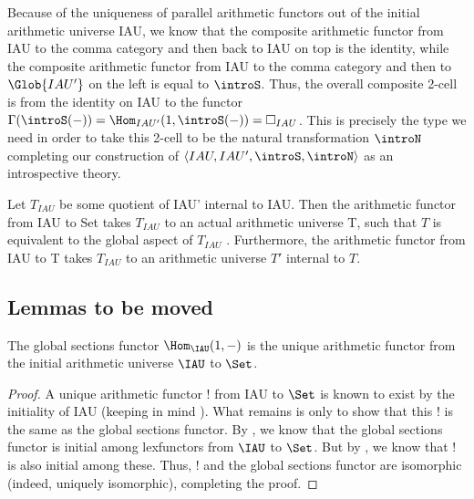 \begin{construction}
Because of the uniqueness of parallel arithmetic functors out of the initial arithmetic universe IAU, we know that the composite arithmetic functor from IAU to the comma category and then back to IAU on top is the identity, while the composite arithmetic functor from IAU to the comma category and then to $\Glob{IAU'}$ on the left is equal to $\introS$. Thus, the overall composite 2-cell is from the identity on IAU to the functor $\Gamma(\introS(-)) = \Hom_{IAU'}(1, \introS(-)) = \Box_{IAU}$. This is precisely the type we need in order to take this 2-cell to be the natural transformation $\introN$ completing our construction of $\langle IAU, IAU', \introS, \introN \rangle$ as an introspective theory.
\end{construction}



Let $T_{IAU}$ be some quotient of IAU' internal to IAU. Then the arithmetic functor from IAU to Set takes $T_{IAU}$ to an actual arithmetic universe T, such that $T$ is equivalent to the global aspect of $T_{IAU}$ . Furthermore, the arithmetic functor from IAU to T takes $T_{IAU}$ to an arithmetic universe $T'$ internal to $T$.

\subsection{Lemmas to be moved}

\begin{theorem}
The global sections functor $\Hom_{\IAU}(1, -)$ is the unique arithmetic functor from the initial arithmetic universe $\IAU$ to $\Set$.
\end{theorem}
\begin{proof}
A unique arithmetic functor $!$ from IAU to $\Set$ is known to exist by the initiality of IAU (keeping in mind ). What remains is only to show that this $!$ is the same as the global sections functor. By , we know that the global sections functor is initial among lexfunctors from $\IAU$ to $\Set$. But by , we know that $!$ is also initial among these. Thus, $!$ and the global sections functor are isomorphic (indeed, uniquely isomorphic), completing the proof.
\end{proof}

